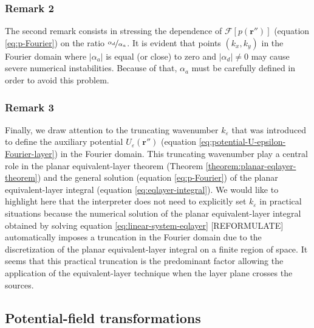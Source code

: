 \subsubsection{Remark 2}

The second remark consists in stressing the dependence of $\mathcal{F} [ p(\mathbf{r}'') ]$ (equation \ref{eq:p-Fourier}) 
on the ratio $\nicefrac{\alpha_{d}}{\alpha_{a}}$. It is evident that points $(k_{x}, k_{y})$ 
in the Fourier domain where 
$\vert \alpha_{a} \vert$ is equal (or close) to zero and $\vert \alpha_{d} \vert \ne 0$  
may cause severe numerical instabilities. Because of that, $\alpha_{a}$ must be carefully defined 
in order to avoid this problem.

\subsubsection{Remark 3}

Finally, we draw attention to the truncating wavenumber $k_{\varepsilon}$ that was introduced to define 
the auxiliary potential $U_{\varepsilon}(\mathbf{r}'')$ (equation \ref{eq:potential-U-epsilon-Fourier-layer}) 
in the Fourier domain.
This truncating wavenumber play a central role in the planar equivalent-layer theorem 
(Theorem \ref{theorem:planar-eqlayer-theorem}) and the general solution (equation \ref{eq:p-Fourier}) of the planar 
equivalent-layer integral (equation \ref{eq:eqlayer-integral}).
We would like to highlight here that the interpreter does not need to explicitly set $k_{\varepsilon}$ 
in practical situations because the numerical solution of the planar equivalent-layer integral obtained by solving 
equation \ref{eq:linear-system-eqlayer} 
[REFORMULATE] automatically imposes a truncation in the Fourier domain due to the discretization of the planar 
equivalent-layer integral on a finite region of space.
It seems that this practical truncation is the predominant factor allowing the application of the equivalent-layer 
technique when the layer plane crosses the sources.

\subsection{Potential-field transformations}

